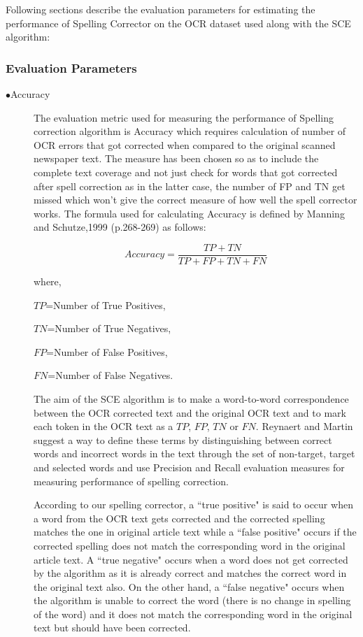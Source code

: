 \documentclass[12pt]{article}
\begin{document}
Following sections describe the evaluation parameters for estimating the performance of Spelling Corrector on the OCR dataset used along with the SCE algorithm:

\subsubsection{Evaluation Parameters}

\begin{description}

 \item[$\bullet$Accuracy]
 The evaluation metric used for measuring the performance of Spelling correction algorithm is Accuracy which requires calculation of number of OCR errors that got corrected when compared to the original scanned newspaper text. The measure has been chosen so as to include the complete text coverage and not just check for words that got corrected after spell correction as in the latter case, the  number of FP and TN get missed which won't give the correct measure of how well the spell corrector works. The formula used for calculating Accuracy is defined by Manning and Schutze,1999 (p.268-269) as follows:

$$Accuracy=  \dfrac{TP+TN} {TP+ FP + TN + FN}$$


where, 

$TP$=Number of True Positives,

$TN$=Number of True Negatives,

 $FP$=Number of False Positives,

 $FN$=Number of False Negatives. 

The aim of the SCE algorithm is to make a word-to-word correspondence between the OCR corrected text and the original OCR text and to mark each token in the OCR text as a $TP$, $FP$, $TN$ or $FN$. Reynaert and Martin\cite{reynaert2008all} suggest a way to define these terms by distinguishing between correct words and incorrect words in the text through the set of non-target, target and selected words and use Precision and Recall evaluation measures for measuring performance of spelling correction. 

According to our spelling corrector, a ``true positive" is said to occur when a word from the OCR text gets corrected and the corrected spelling matches the one in original article text while a ``false positive" occurs if the corrected spelling does not match the corresponding word in the original article text. A ``true negative" occurs when a word does not get corrected by the algorithm as it is already correct and matches the correct word in the original text also. On the other hand, a ``false negative" occurs when the algorithm is unable to correct the word (there is no change in spelling of the word) and it does not match the corresponding word in the original text but should have been corrected.




\end{description}
\end{document}
